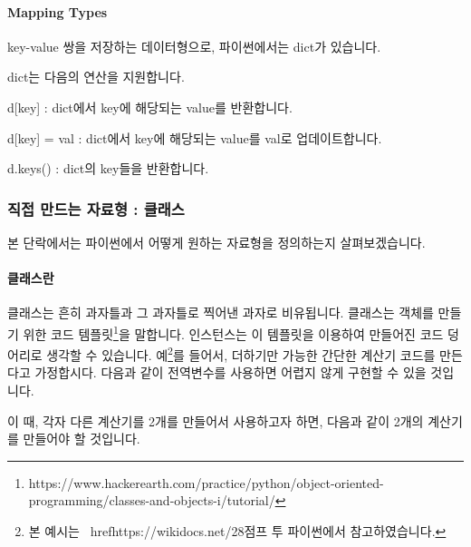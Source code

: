 \documentclass[twoside]{article}
\begin{document}
\paragraph{Mapping Types} key-value 쌍을 저장하는 데이터형으로, 파이썬에서는 dict가 있습니다. 



dict는 다음의 연산을 지원합니다. 
\begin{compactitem} 
\item d[key] : dict에서 key에 해당되는 value를 반환합니다. 
\item d[key] = val : dict에서 key에 해당되는 value를 val로 업데이트합니다. 
\item d.keys() : dict의 key들을 반환합니다. 
\end{compactitem}




                
\subsubsection{직접 만드는 자료형 : 클래스}

본 단락에서는 파이썬에서 어떻게 원하는 자료형을 정의하는지 살펴보겠습니다. 

\paragraph{클래스란} 

클래스는 흔히 과자틀과 그 과자틀로 찍어낸 과자로 비유됩니다. 클래스는 객체를 만들기 위한 코드 템플릿\footnote{https://www.hackerearth.com/practice/python/object-oriented-programming/classes-and-objects-i/tutorial/}을 말합니다. 인스턴스는 이 템플릿을 이용하여 만들어진 코드 덩어리로 생각할 수 있습니다. 예\footnote{본 예시는 \ href{https://wikidocs.net/28}{점프 투 파이썬}에서 참고하였습니다.}를 들어서, 더하기만 가능한 간단한 계산기 코드를 만든다고 가정합시다. 다음과 같이 전역변수를 사용하면 어렵지 않게 구현할 수 있을 것입니다. 



이 때, 각자 다른 계산기를 2개를 만들어서 사용하고자 하면, 다음과 같이 2개의 계산기를 만들어야 할 것입니다.
\end{document}
